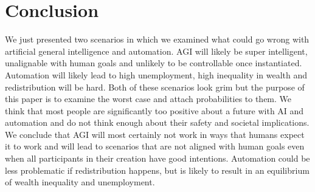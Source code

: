\documentclass[conference]{IEEEtran}
\begin{document}
\section{Conclusion}
%
We just presented two scenarios in which we examined what could go wrong with artificial general intelligence and automation. AGI will likely be super intelligent, unalignable with human goals and unlikely to be controllable once instantiated. Automation will likely lead to high unemployment, high inequality in wealth and redistribution will be hard.
Both of these scenarios look grim but the purpose of this paper is to examine the worst case and attach probabilities to them. We think that most people are significantly too positive about a future with AI and automation and do not think enough about their safety and societal implications. We conclude that AGI will most certainly not work in ways that humans expect it to work and will lead to scenarios that are not aligned with human goals even when all participants in their creation have good intentions. Automation could be less problematic if redistribution happens, but is likely to result in an equilibrium of wealth inequality and unemployment.



\end{document}
